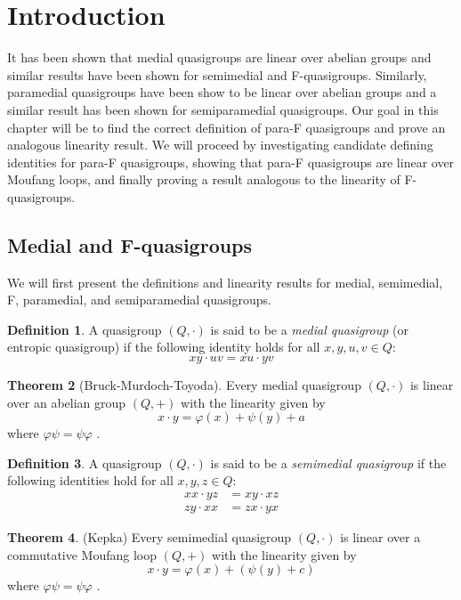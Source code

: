 \documentclass[12pt]{report}
\theoremstyle{definition}
\newtheorem{thm}{Theorem}[chapter]
\newtheorem{dfn}[thm]{Definition}
\begin{document}
\section{Introduction}\label{para-f-intro}

It has been shown that medial quasigroups are linear over abelian groups and similar results have
  been shown for semimedial and F-quasigroups. Similarly, paramedial quasigroups have been show
  to be linear over abelian groups and a similar result has been shown for semiparamedial
  quasigroups. Our goal in this chapter will be to find the correct definition of para-F quasigroups
  and prove an analogous linearity result. We will proceed by investigating candidate defining
  identities for para-F quasigroups, showing that para-F quasigroups are linear over Moufang loops,
  and finally proving a result analogous to the linearity of F-quasigroups.

\subsection{Medial and F-quasigroups}

We will first present the definitions and linearity results for medial, semimedial, F,
  paramedial, and semiparamedial quasigroups.

\begin{dfn}
  A quasigroup $(Q, \cdot)$ is said to be a \emph{medial quasigroup} (or entropic quasigroup)
    if the following identity holds for all $x, y, u, v\in Q$:
  \[xy\cdot uv = xu\cdot yv\]
\end{dfn}

\begin{thm}[Bruck-Murdoch-Toyoda]
  Every medial quasigroup $(Q, \cdot)$ is linear over an abelian group $(Q, +)$ with the linearity
    given by
  \[x\cdot y = \varphi(x) + \psi(y) + a\]
  where $\varphi\psi = \psi\varphi$ \cite{SP}.
\end{thm}

\begin{dfn}
  A quasigroup $(Q, \cdot)$ is said to be a \emph{semimedial quasigroup} if the following identities
    hold for all $x, y, z\in Q$:
  \begin{align*}
    xx\cdot yz &= xy\cdot xz\\
    zy\cdot xx &= zx\cdot yx
  \end{align*}
\end{dfn}

\begin{thm}(Kepka)
  Every semimedial quasigroup $(Q, \cdot)$ is linear over a commutative Moufang loop $(Q, +)$ with
    the linearity given by
  \[x\cdot y = \varphi(x) + (\psi(y) + c)\]
  where $\varphi\psi = \psi\varphi$ \cite{triabelian}.
\end{thm}
\end{document}
